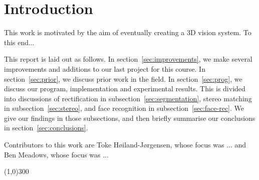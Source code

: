
\section{Introduction}

This work is motivated by the aim of eventually creating a 3D vision system. To this end...

This report is laid out as follows. In section~\ref{sec:improvements}, we make several improvements and additions to our last project for this course. In section~\ref{sec:prior}, we discuss prior work in the field. In section~\ref{sec:prog}, we discuss our program, implementation and experimental results. This is divided into discussions of rectification in subsection~\ref{sec:segmentation}, stereo matching in subsection~\ref{sec:stereo}, and face recognition in subsection~\ref{sec:face-rec}. We give our findings in those subsections, and then briefly summarise our conclusions in section~\ref{sec:conclusions}.

Contributors to this work are Toke Høiland-Jørgensen, whose focus was ... and Ben Meadows, whose focus was ...

\begin{center}
\line(1,0){300}
\end{center}
